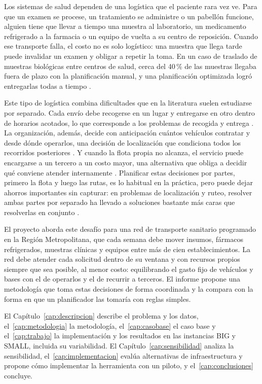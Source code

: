 Los sistemas de salud dependen de una logística que el paciente rara vez ve. Para que un examen se procese, un tratamiento se administre o un pabellón funcione, alguien tiene que llevar a tiempo una muestra al laboratorio, un medicamento refrigerado a la farmacia o un equipo de vuelta a su centro de reposición. Cuando ese transporte falla, el costo no es solo logístico: una muestra que llega tarde puede invalidar un examen y obligar a repetir la toma. En un caso de traslado de muestras biológicas entre centros de salud, cerca del 40\,\% de las muestras llegaba fuera de plazo con la planificación manual, y una planificación optimizada logró entregarlas todas a tiempo \cite{benini_detti_zabalo_2021}.

Este tipo de logística combina dificultades que en la literatura suelen estudiarse por separado. Cada envío debe recogerse en un lugar y entregarse en otro dentro de horarios acotados, lo que corresponde a los problemas de recogida y entrega \cite{parragh_doerner_hartl_2008}. La organización, además, decide con anticipación cuántos vehículos contratar y desde dónde operarlos, una decisión de localización que condiciona todos los recorridos posteriores \cite{prodhon_prins_2014}. Y cuando la flota propia no alcanza, el servicio puede encargarse a un tercero a un costo mayor, una alternativa que obliga a decidir qué conviene atender internamente \cite{dabia_lai_vigo_2019}. Planificar estas decisiones por partes, primero la flota y luego las rutas, es lo habitual en la práctica, pero puede dejar ahorros importantes sin capturar: en problemas de localización y ruteo, resolver ambas partes por separado ha llevado a soluciones bastante más caras que resolverlas en conjunto \cite{prodhon_prins_2014}.

El proyecto aborda este desafío para una red de transporte sanitario programado en la Región Metropolitana, que cada semana debe mover insumos, fármacos refrigerados, muestras clínicas y equipos entre más de cien establecimientos. La red debe atender cada solicitud dentro de su ventana y con recursos propios siempre que sea posible, al menor costo: equilibrando el gasto fijo de vehículos y bases con el de operarlos y el de recurrir a terceros. El informe propone una metodología que toma estas decisiones de forma coordinada y la compara con la forma en que un planificador las tomaría con reglas simples.

El Capítulo~\ref{cap:descripcion} describe el problema y los datos, el~\ref{cap:metodologia} la metodología, el~\ref{cap:casobase} el caso base y el~\ref{cap:trabajo} la implementación y los resultados en las instancias BIG y SMALL, incluida su variabilidad. El Capítulo~\ref{cap:sensibilidad} analiza la sensibilidad, el~\ref{cap:implementacion} evalúa alternativas de infraestructura y propone cómo implementar la herramienta con un piloto, y el~\ref{cap:conclusiones} concluye.
